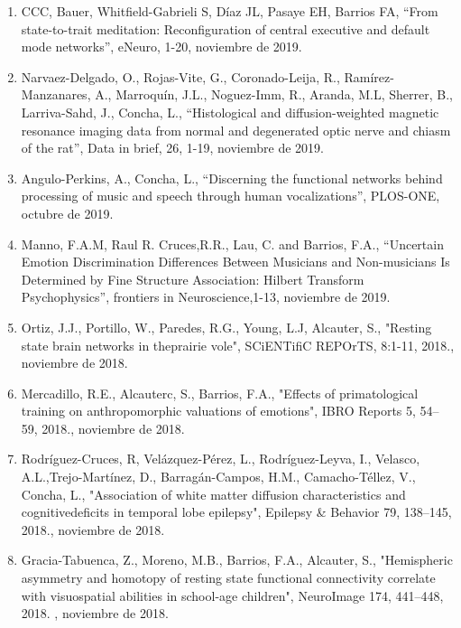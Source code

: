 \begin{enumerate}
\item CCC, Bauer, Whitfield-Gabrieli S, Díaz JL, Pasaye EH, Barrios FA, “From state-to-trait meditation: Reconfiguration of central executive and default mode 
networks”, eNeuro, 1-20,  noviembre de 2019.

\item Narvaez-Delgado, O., Rojas-Vite, G., Coronado-Leija, R., Ramírez-Manzanares, A., Marroquín, J.L., Noguez-Imm, R., Aranda, M.L, Sherrer, B., Larriva-Sahd, 
J., Concha, L., “Histological and diffusion-weighted magnetic resonance imaging data from normal and degenerated optic nerve and chiasm of the rat”, Data in 
brief, 26, 1-19,  noviembre de 2019.

\item Angulo-Perkins, A., Concha, L., “Discerning the functional networks behind processing of music and speech through human vocalizations”, PLOS-ONE,  octubre 
de 2019.

\item Manno, F.A.M, Raul R. Cruces,R.R., Lau, C. and Barrios, F.A., “Uncertain Emotion Discrimination Differences Between Musicians and Non-musicians Is 
Determined by Fine Structure Association: Hilbert Transform Psychophysics”, frontiers in Neuroscience,1-13,  noviembre de 2019.

\item Ortiz, J.J., Portillo, W., Paredes, R.G., Young, L.J, Alcauter, S., "Resting state brain networks in theprairie vole", SCiENTifiC REPOrTS, 8:1-11, 2018.,  
noviembre de 2018.

\item Mercadillo, R.E., Alcauterc, S., Barrios, F.A., "Effects of primatological training on anthropomorphic valuations of emotions", IBRO Reports 5, 54–59, 
2018.,  noviembre de 2018.

\item Rodríguez-Cruces, R, Velázquez-Pérez, L., Rodríguez-Leyva, I., Velasco, A.L.,Trejo-Martínez, D., Barragán-Campos, H.M., Camacho-Téllez, V., Concha, L., 
"Association of white matter diffusion characteristics and cognitivedeficits in temporal lobe epilepsy", Epilepsy \& Behavior 79, 138–145, 2018.,  noviembre 
de 2018.

\item Gracia-Tabuenca, Z., Moreno, M.B., Barrios, F.A., Alcauter, S., "Hemispheric asymmetry and homotopy of resting state functional connectivity correlate with 
visuospatial abilities in school-age children", NeuroImage 174, 441–448, 2018. ,  noviembre de 2018.


\end{enumerate}
